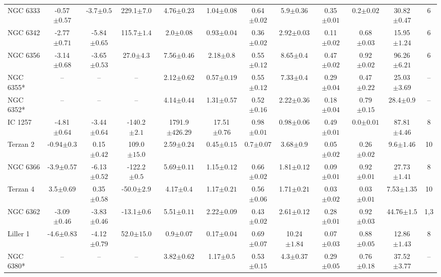 \begin{landscape}
\begin{table}
\begin{tabular}{lccccccccccc}
NGC 6333 & -0.57$\pm{0.57}$ & -3.7$\pm{0.5}$ & 229.1$\pm{7.0}$ & 4.76$\pm{0.23}$ & 1.04$\pm{0.08}$ & 0.64$\pm{0.02}$ & 5.9$\pm{0.36}$ & 0.35$\pm{0.01}$ & 0.2$\pm{0.02}$ & 30.82$\pm{0.47}$&6 \\ 
NGC 6342 & -2.77$\pm{0.71}$ & -5.84$\pm{0.65}$ & 115.7$\pm{1.4}$ & 2.0$\pm{0.08}$ & 0.93$\pm{0.04}$ & 0.36$\pm{0.02}$ & 2.92$\pm{0.03}$ & 0.11$\pm{0.02}$ & 0.68$\pm{0.03}$ & 15.95$\pm{1.24}$&6 \\ 
NGC 6356 & -3.14$\pm{0.68}$ & -3.65$\pm{0.53}$ & 27.0$\pm{4.3}$ & 7.56$\pm{0.46}$ & 2.18$\pm{0.8}$ & 0.55$\pm{0.12}$ & 8.65$\pm{0.4}$ & 0.47$\pm{0.02}$ & 0.92$\pm{0.02}$ & 96.26$\pm{6.21}$&6 \\ 
NGC 6355* & -- & -- & -- & 2.12$\pm{0.62}$ & 0.57$\pm{0.19}$ & 0.55$\pm{0.12}$ & 7.33$\pm{0.4}$ & 0.29$\pm{0.04}$ & 0.47$\pm{0.22}$ & 25.03$\pm{3.69}$&-- \\ 
NGC 6352* & -- & -- & -- & 4.14$\pm{0.44}$ & 1.31$\pm{0.57}$ & 0.52$\pm{0.16}$ & 2.22$\pm{0.36}$ & 0.18$\pm{0.04}$ & 0.79$\pm{0.15}$ & 28.4$\pm{0.9}$&-- \\ 
IC 1257 & -4.81$\pm{0.64}$ & -3.44$\pm{0.64}$ & -140.2$\pm{2.1}$ & 1791.9$\pm{426.29}$ & 17.51$\pm{0.76}$ & 0.98$\pm{0.01}$ & 0.98$\pm{0.06}$ & 0.49$\pm{0.01}$ & 0.0$\pm{0.01}$ & 87.81$\pm{4.46}$&8 \\ 
Terzan 2 & -0.94$\pm{0.3}$ & 0.15$\pm{0.42}$ & 109.0$\pm{15.0}$ & 2.59$\pm{0.24}$ & 0.45$\pm{0.15}$ & 0.7$\pm{0.07}$ & 3.68$\pm{0.9}$ & 0.05$\pm{0.02}$ & 0.26$\pm{0.02}$ & 9.6$\pm{1.46}$&10 \\ 
NGC 6366 & -3.9$\pm{0.57}$ & -6.13$\pm{0.52}$ & -122.2$\pm{0.5}$ & 5.69$\pm{0.11}$ & 1.15$\pm{0.12}$ & 0.66$\pm{0.02}$ & 1.81$\pm{0.12}$ & 0.09$\pm{0.01}$ & 0.92$\pm{0.01}$ & 27.73$\pm{1.41}$&8 \\ 
Terzan 4 & 3.5$\pm{0.69}$ & 0.35$\pm{0.58}$ & -50.0$\pm{2.9}$ & 4.17$\pm{0.4}$ & 1.17$\pm{0.21}$ & 0.56$\pm{0.06}$ & 1.71$\pm{0.21}$ & 0.03$\pm{0.02}$ & 0.03$\pm{0.01}$ & 7.53$\pm{1.35}$&10 \\ 
NGC 6362 & -3.09$\pm{0.46}$ & -3.83$\pm{0.46}$ & -13.1$\pm{0.6}$ & 5.51$\pm{0.11}$ & 2.22$\pm{0.09}$ & 0.43$\pm{0.02}$ & 2.61$\pm{0.12}$ & 0.28$\pm{0.01}$ & 0.92$\pm{0.03}$ & 44.76$\pm{1.5}$&1,3 \\ 
Liller 1 & -4.6$\pm{0.83}$ & -4.12$\pm{0.79}$ & 52.0$\pm{15.0}$ & 0.9$\pm{0.07}$ & 0.17$\pm{0.04}$ & 0.69$\pm{0.07}$ & 10.24$\pm{1.84}$ & 0.07$\pm{0.03}$ & 0.88$\pm{0.05}$ & 12.86$\pm{1.43}$&8 \\ 
NGC 6380* & -- & -- & -- & 3.82$\pm{0.62}$ & 1.17$\pm{0.5}$ & 0.53$\pm{0.15}$ & 4.3$\pm{0.37}$ & 0.29$\pm{0.05}$ & 0.76$\pm{0.18}$ & 37.52$\pm{3.77}$&-- \\ 

\end{tabular}
\end{table}
\end{landscape}
